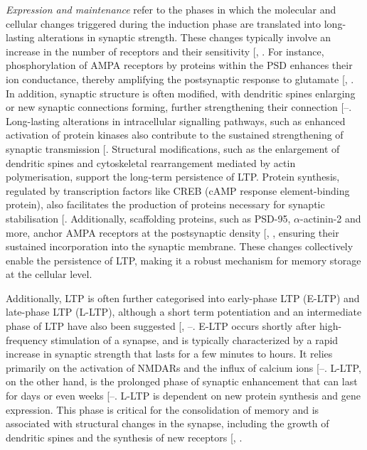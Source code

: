 \documentclass[
  11pt,
  letterpaper,
]{scrreprt}
\begin{document}
\emph{Expression and maintenance} refer to the phases in which the
molecular and cellular changes triggered during the induction phase are
translated into long-lasting alterations in synaptic strength. These
changes typically involve an increase in the number of receptors and
their sensitivity {[},
\citeproc{ref-abraham2008LTP}{81}{]}. For instance, phosphorylation of
AMPA receptors by proteins within the PSD enhances their ion
conductance, thereby amplifying the postsynaptic response to glutamate
{[},
\citeproc{ref-purkey2020PhosphorylationDependent}{83}{]}. In addition,
synaptic structure is often modified, with dendritic spines enlarging or
new synaptic connections forming, further strengthening their connection
{[}--\citeproc{ref-meldolesi2022PostSynapses}{86}{]}.
Long-lasting alterations in intracellular signalling pathways, such as
enhanced activation of protein kinases also contribute to the sustained
strengthening of synaptic transmission
{[}\citeproc{ref-mayford2007Protein}{87}{]}. Structural modifications,
such as the enlargement of dendritic spines and cytoskeletal
rearrangement mediated by actin polymerisation, support the long-term
persistence of LTP. Protein synthesis, regulated by transcription
factors like CREB (cAMP response element-binding protein), also
facilitates the production of proteins necessary for synaptic
stabilisation {[}\citeproc{ref-lamprecht2004Structurala}{88}{]}.
Additionally, scaffolding proteins, such as PSD-95, \(\alpha\)-actinin-2
and more, anchor AMPA receptors at the postsynaptic density
{[},
\citeproc{ref-ivie2018ReproducibilityScientificComputing}{90}{]},
ensuring their sustained incorporation into the synaptic membrane. These
changes collectively enable the persistence of LTP, making it a robust
mechanism for memory storage at the cellular level.

Additionally, LTP is often further categorised into early-phase LTP
(E-LTP) and late-phase LTP (L-LTP), although a short term potentiation
and an intermediate phase of LTP have also been suggested
{[},
--\citeproc{ref-lisman2005Phases}{93}{]}.
E-LTP occurs shortly after high-frequency stimulation of a synapse, and
is typically characterized by a rapid increase in synaptic strength that
lasts for a few minutes to hours. It relies primarily on the activation
of NMDARs and the influx of calcium ions
{[}--\citeproc{ref-bliss2018Longterm}{97}{]}.
L-LTP, on the other hand, is the prolonged phase of synaptic enhancement
that can last for days or even weeks
{[}--\citeproc{ref-mohns2008Synchronous}{103}{]}.
L-LTP is dependent on new protein synthesis and gene expression. This
phase is critical for the consolidation of memory and is associated with
structural changes in the synapse, including the growth of dendritic
spines and the synthesis of new receptors
{[},
\citeproc{ref-baltaci2019Molecular}{104}{]}.
\end{document}
